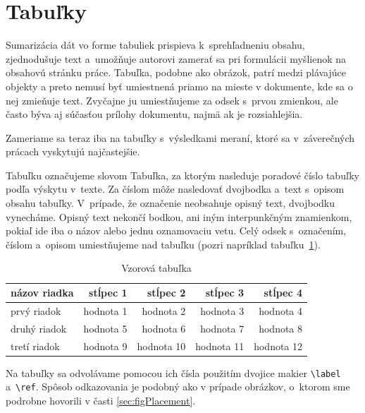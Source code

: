 \section{Tabuľky}
Sumarizácia dát vo forme tabuliek prispieva
k~sprehľadneniu obsahu, zjednodušuje text
a~umožňuje autorovi zamerať sa pri formulácii myšlienok na
obsahovú stránku práce.
Tabuľka, podobne ako obrázok, patrí medzi plávajúce objekty
a preto nemusí byť umiestnená priamo na mieste v dokumente,
kde sa o nej zmieňuje text.
Zvyčajne ju umiestňujeme za odsek s~prvou zmienkou,
ale často býva aj súčasťou prílohy dokumentu,
najmä ak je rozsiahlejšia.

Zameriame sa teraz iba na tabuľky s~výsledkami meraní,
ktoré sa v~záverečných prácach vyskytujú najčastejšie.

Tabuľku označujeme slovom Tabuľka,
za ktorým nasleduje poradové číslo tabuľky podľa výskytu
v~texte.
Za číslom môže nasledovať dvojbodka a~text s~opisom obsahu
tabuľky.
V~prípade, že označenie neobsahuje opisný text,
dvojbodku vynecháme.
Opisný text nekončí bodkou,
ani iným interpunkčným znamienkom,
pokiaľ ide iba o názov alebo jednu oznamovaciu vetu.
Celý odsek s~označením, číslom a~opisom umiestňujeme
nad tabuľku (pozri napríklad tabuľku~\ref{tab:template}).

\begin{table}[h!]
  \caption{Vzorová tabuľka}
  \label{tab:template}
  \centering
  \begin{tabular}{@{}lrrrr@{}}
    \toprule
    \textbf{názov riadka} & \textbf{stĺpec 1} & \textbf{stĺpec 2} & \textbf{stĺpec 3} & \textbf{stĺpec 4} \\
    \midrule
    prvý riadok & hodnota 1 & hodnota 2 & hodnota 3 & hodnota 4\\
    druhý riadok & hodnota 5 & hodnota 6 & hodnota 7 & hodnota 8\\
    tretí riadok & hodnota 9 & hodnota 10 & hodnota 11 & hodnota 12\\
    \bottomrule
  \end{tabular}
\end{table}

Na tabuľky sa odvolávame pomocou ich čísla použitím dvojice makier
\verb|\label| a~\verb|\ref|.
Spôsob odkazovania je podobný ako v prípade obrázkov,
o~ktorom sme podrobne hovorili v časti \ref{sec:figPlacement}.

